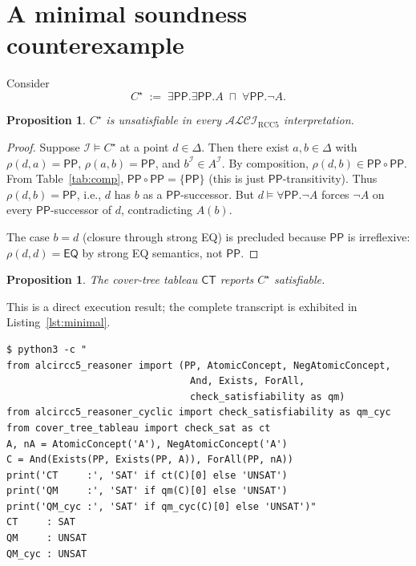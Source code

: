 \documentclass[]{ceurart}
\newcommand{\ALCI}{\mathcal{ALCI}}
\newcommand{\ALCIRCC}[1]{\ALCI_{\mathrm{RCC}#1}}
\newcommand{\PP}{\mathsf{PP}}
\newcommand{\EQ}{\mathsf{EQ}}
\newcommand{\comp}{\circ}
\newtheorem{proposition}[theorem]{Proposition}
\theoremstyle{definition}
\theoremstyle{remark}
\begin{document}
\section{A minimal soundness counterexample}
\label{sec:minimal}

Consider
\begin{equation}
  C^{\star} \;:=\; \exists \PP . \exists \PP . A
    \;\sqcap\; \forall \PP . \neg A.
  \label{eq:minimal}
\end{equation}

\begin{proposition}
  \label{prop:minimal-unsat}
  $C^{\star}$ is unsatisfiable in every $\ALCIRCC{5}$
  interpretation.
\end{proposition}

\begin{proof}
  Suppose $\mathcal{I} \models C^{\star}$ at a point $d \in \Delta$.
  Then there exist $a, b \in \Delta$ with
  $\rho(d, a) = \PP$, $\rho(a, b) = \PP$, and $b^{\mathcal{I}} \in A^{\mathcal{I}}$.
  By composition, $\rho(d, b) \in \PP \comp \PP$.  From
  Table~\ref{tab:comp}, $\PP \comp \PP = \{\PP\}$ (this is just
  $\PP$-transitivity). Thus $\rho(d, b) = \PP$, i.e.,
  $d$ has $b$ as a $\PP$-successor. But $d \models \forall \PP . \neg A$
  forces $\neg A$ on every $\PP$-successor of $d$, contradicting
  $A(b)$.

  The case $b = d$ (closure through strong EQ) is precluded because
  $\PP$ is irreflexive: $\rho(d, d) = \EQ$ by strong EQ semantics,
  not $\PP$.
\end{proof}

\begin{proposition}
  \label{prop:minimal-ct-sat}
  The cover-tree tableau $\mathsf{CT}$ reports $C^{\star}$
  satisfiable.
\end{proposition}

This is a direct execution result; the complete transcript is
exhibited in Listing~\ref{lst:minimal}.

\begin{lstlisting}[caption={Re-executing the minimal counterexample from \texttt{src/}, without modifying the repository. $\mathsf{QM}_{\mathrm{cyc}}$ and $\mathsf{QM}$ agree with Proposition~\ref{prop:minimal-unsat} (UNSAT); $\mathsf{CT}$ disagrees.}, label={lst:minimal}, float=t]
$ python3 -c "
from alcircc5_reasoner import (PP, AtomicConcept, NegAtomicConcept,
                                And, Exists, ForAll,
                                check_satisfiability as qm)
from alcircc5_reasoner_cyclic import check_satisfiability as qm_cyc
from cover_tree_tableau import check_sat as ct
A, nA = AtomicConcept('A'), NegAtomicConcept('A')
C = And(Exists(PP, Exists(PP, A)), ForAll(PP, nA))
print('CT     :', 'SAT' if ct(C)[0] else 'UNSAT')
print('QM     :', 'SAT' if qm(C)[0] else 'UNSAT')
print('QM_cyc :', 'SAT' if qm_cyc(C)[0] else 'UNSAT')"
CT     : SAT
QM     : UNSAT
QM_cyc : UNSAT
\end{lstlisting}
\end{document}
